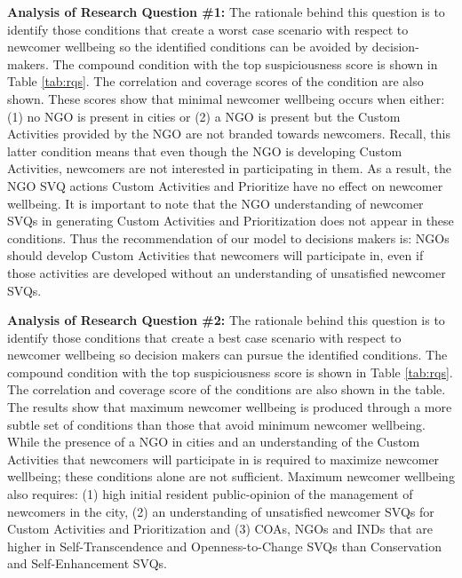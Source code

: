 \documentclass{scspaperproc}
\theoremstyle{scsthe}
\begin{document}
{\bf Analysis of Research Question \#1:} The rationale behind this question is to identify those conditions that create a worst case scenario with respect to newcomer wellbeing so the identified conditions can be avoided by decision-makers. The compound condition with the top suspiciousness score is shown in Table \ref{tab:rqs}. The correlation and coverage scores of the condition are also shown. These scores show that minimal newcomer wellbeing occurs when either: (1) no NGO is present in cities or (2) a NGO is present but the Custom Activities provided by the NGO are not branded towards newcomers. Recall, this latter condition means that even though the NGO is developing Custom Activities, newcomers are not interested in participating in them. As a result, the NGO SVQ actions Custom Activities and Prioritize have no effect on newcomer wellbeing. It is important to note that the NGO understanding of newcomer SVQs in generating Custom Activities and Prioritization does not appear in these conditions. Thus the recommendation of our model to decisions makers is: NGOs should develop Custom Activities that newcomers will participate in, even if those activities are developed without an understanding of unsatisfied newcomer SVQs. 

{\bf Analysis of Research Question \#2:} The rationale behind this question is to identify those conditions that create a best case scenario with respect to newcomer wellbeing so decision makers can pursue the identified conditions. The compound condition with the top suspiciousness score is shown in Table \ref{tab:rqs}. The correlation and coverage score of the conditions are also shown in the table. The results show that maximum newcomer wellbeing is produced through a more subtle set of conditions than those that avoid minimum newcomer wellbeing. While the presence of a NGO in cities and an understanding of the Custom Activities that newcomers will participate in is required to maximize newcomer wellbeing; these conditions alone are not sufficient. Maximum newcomer wellbeing also requires: (1) high initial resident public-opinion of the management of newcomers in the city, (2) an understanding of unsatisfied newcomer SVQs for Custom Activities and Prioritization and (3) COAs, NGOs and INDs that are higher in Self-Transcendence and Openness-to-Change SVQs than Conservation and Self-Enhancement SVQs.
\end{document}
